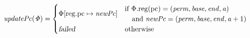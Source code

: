 \documentclass{article}
\newcommand{\update}[2]{[#1 \mapsto #2]}
\newcommand{\var}[1]{\mathit{#1}}
\newcommand{\pcreg}{\mathrm{pc}}
\newcommand{\addr}{\var{a}}
\newcommand{\start}{\var{base}}
\newcommand{\addrend}{\var{end}}
\newcommand{\perm}{\var{perm}}
\newcommand{\stdcap}[1][\perm]{\left(#1,\start,\addrend,\addr \right)}
\newcommand{\plainproj}[1]{\mathrm{#1}}
\newcommand{\memreg}[1][\Phi]{#1.\plainproj{reg}}
\newcommand{\updateReg}[3][\Phi]{#1\update{\plainproj{reg}.#2}{#3}}
\newcommand{\failed}{\textsl{failed}}
\newcommand{\plainfun}[1]{\mathit{#1}}
\newcommand{\stdUpdatePc}[1]{\plainfun{updatePc(#1)}}
\begin{document}
\begin{align*}
  \stdUpdatePc{\Phi} &=
                       \begin{cases}
                         \updateReg{\pcreg}{\var{newPc}} & 
                           \arraycolsep=0pt
                           \begin{array}{l}
                             \text{if $\memreg(\pcreg) = \stdcap$}\\
                             \quad\text{and $\var{newPc} = (\perm,\start,\addrend,\addr + 1)$}\\
                           \end{array} \\
                           \failed & \text{otherwise}
                       \end{cases} \\
\end{align*}
\end{document}
